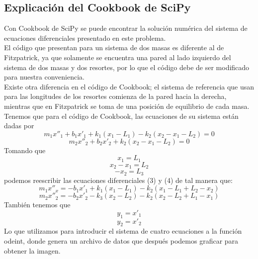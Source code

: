 \documentclass[11pt, spanish]{report}
\begin{document}
\subsection{Explicación del Cookbook de SciPy}
Con Cookbook de SciPy se puede encontrar la solución numérica del sistema de ecuaciones diferenciales presentado en este problema. \\
El código que presentan para un sistema de dos masas es diferente al de Fitzpatrick, ya que solamente se encuentra una pared al lado izquierdo del sistema de dos masas y dos resortes, por lo que el código debe de ser modificado para nuestra conveniencia. \\
Existe otra diferencia en el código de Cookbook; el sistema de referencia que usan para las longitudes de los resortes comienza de la pared hacia la derecha, mientras que en Fitzpatrick se toma de una posición de equilibrio de cada masa.
\\
Tenemos que para el código de Cookbook, las ecuaciones de su sistema están dadas por
\begin{equation}
    m_1x''_1+b_1x'_1+k_1(x_1-L_1)-k_2(x_2-x_1-L_2)=0
\end{equation}
\begin{equation}
    m_2x''_2+b_2x'_2+k_2(x_2-x_1-L_2)=0
\end{equation}
Tomando que $$x_1=L_1$$ $$x_2-x_1=L_2$$ $$-x_2=L_3$$
podemos reescribir las ecuaciones diferenciales (3) y (4) de tal manera que:
\begin{equation}
    m_1x''_x=-b_1x'_1+k_1(x_1-L_1)-k_2(x_1-L_1+L_2-x_2)
\end{equation}
\begin{equation}
    m_2x''_2=-b_2x'_2-k_3(x_2-L_2)-k_2(x_2-L_2+L_1-x_1)
\end{equation}
También tenemos que
\begin{equation}
    y_1=x'_1
\end{equation}
\begin{equation}
    y_2=x'_2
\end{equation}
Lo que utilizamos para introducir el sistema de cuatro ecuaciones a la función odeint, donde genera un archivo de datos que después podemos graficar para obtener la imagen.
\end{document}
